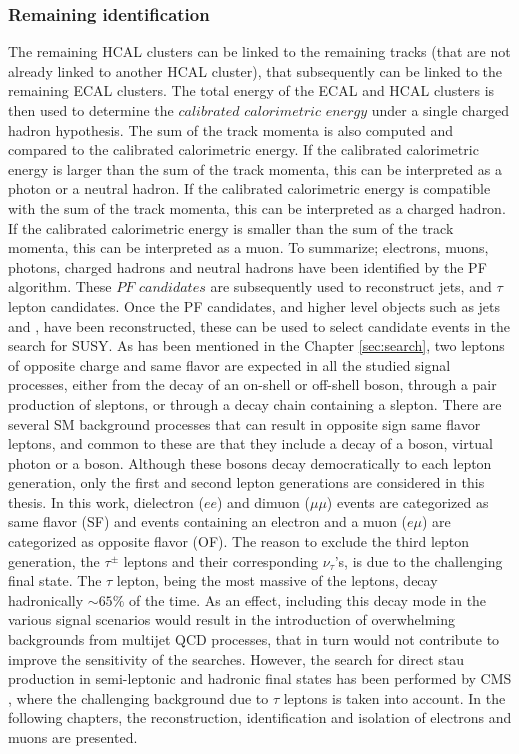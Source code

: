 \subsubsection*{Remaining identification}
\noindent\justify
The remaining HCAL clusters can be linked to the remaining tracks (that are not already linked to another HCAL cluster), that subsequently can be linked to the remaining ECAL clusters. 
The total energy of the ECAL and HCAL clusters is then used to determine the $calibrated$ $calorimetric$ $energy$ under a single charged hadron hypothesis. 
The sum of the track momenta is also computed and compared to the calibrated calorimetric energy. 
If the calibrated calorimetric energy is larger than the sum of the track momenta, this can be interpreted as a photon or a neutral hadron. 
If the calibrated calorimetric energy is compatible with the sum of the track momenta, this can be interpreted as a charged hadron. 
If the calibrated calorimetric energy is smaller than the sum of the track momenta, this can be interpreted as a muon. 
\newpara
\noindent\justify
To summarize; electrons, muons, photons, charged hadrons and neutral hadrons have been identified by the PF algorithm. 
These $PF$ $candidates$ are subsequently used to reconstruct jets, \ptmiss and $\tau$ lepton candidates.   
\newpara
\noindent\justify
Once the PF candidates, and higher level objects such as jets and \ptmiss, have been reconstructed, these can be used to select candidate events in the search for SUSY. 
As has been mentioned in the Chapter \ref{sec:search}, two leptons of opposite charge and same flavor are expected in all the studied signal processes, either from the decay of an on-shell or off-shell \PZ boson, through a pair production of sleptons, or through a decay chain containing a slepton.  
There are several SM background processes that can result in opposite sign same flavor leptons, and common to these are that they include a decay of a \PZ boson, virtual photon or a \PW boson. 
Although these bosons decay democratically to each lepton generation, only the first and second lepton generations are considered in this thesis. 
In this work, dielectron ($ee$) and dimuon ($\mu\mu$) events are categorized as same flavor (SF) and events containing an electron and a muon ($e\mu$) are categorized as opposite flavor (OF). 
The reason to exclude the third lepton generation, the $\tau^{\pm}$ leptons and their corresponding $\nu_{\tau}$'s, is due to the challenging final state. 
The $\tau$ lepton, being the most massive of the leptons, decay hadronically $\sim65\%$ of the time. 
As an effect, including this decay mode in the various signal scenarios would result in the introduction of overwhelming backgrounds from multijet QCD processes, that in turn would not contribute to improve the sensitivity of the searches. 
However, the search for direct stau production in semi-leptonic and hadronic final states has been performed by CMS \cite{CMS-PAS-SUS-17-002,Sirunyan:2018vig}, where the challenging background due to $\tau$ leptons is taken into account.  
In the following chapters, the reconstruction, identification and isolation of electrons and muons are presented. 
